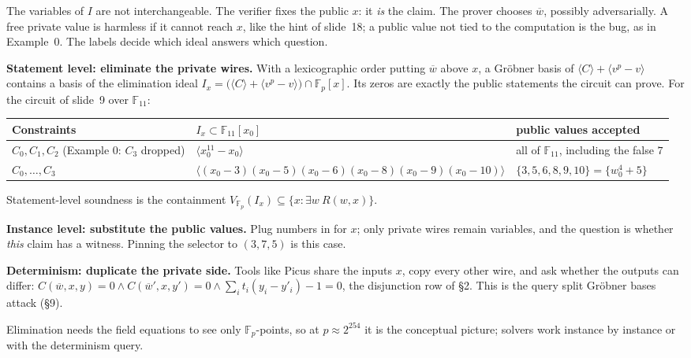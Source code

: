 \documentclass[10pt]{article}
\newcommand{\F}{\mathbb F}\newcommand{\wb}{\overline w}
\newcommand{\sect}[1]{\par\vspace{4pt}{\large\bfseries #1}\par\nobreak\vspace{1pt}}
\begin{document}
\sect{6. Public and private wires play different roles}
The variables of $I$ are not interchangeable. The verifier fixes the public $x$: it \emph{is} the claim. The prover chooses $\wb$,
possibly adversarially. A free private value is harmless if it cannot reach $x$, like the hint of slide~18; a public value not tied to
the computation is the bug, as in Example~0. The labels decide which ideal answers which question.
\par\textbf{Statement level: eliminate the private wires.} With a lexicographic order putting $\wb$ above $x$, a Gr\"obner basis of
$\langle C\rangle+\langle v^p-v\rangle$ contains a basis of the elimination ideal
$I_x=\bigl(\langle C\rangle+\langle v^p-v\rangle\bigr)\cap\F_p[x]$. Its zeros are exactly the public statements the circuit can
prove. For the circuit of slide~9 over $\F_{11}$:
\begin{center}\begin{tabular}{@{}lll@{}}\toprule
Constraints & $I_x\subset\F_{11}[x_0]$ & public values accepted\\\midrule
$C_0,C_1,C_2$ (Example 0: $C_3$ dropped) & $\langle x_0^{11}-x_0\rangle$ & all of $\F_{11}$, including the false $7$\\
$C_0,\dots,C_3$ & $\langle(x_0-3)(x_0-5)(x_0-6)(x_0-8)(x_0-9)(x_0-10)\rangle$ & $\{3,5,6,8,9,10\}=\{w_0^4+5\}$\\
\bottomrule\end{tabular}\end{center}
Statement-level soundness is the containment $V_{\F_p}(I_x)\subseteq\{x : \exists w\ R(w,x)\}$.
\par\textbf{Instance level: substitute the public values.} Plug numbers in for $x$; only private wires remain variables, and the question
is whether \emph{this} claim has a witness. Pinning the selector to $(3,7,5)$ is this case.
\par\textbf{Determinism: duplicate the private side.} Tools like Picus share the inputs $x$, copy every other wire, and ask whether the
outputs can differ: $C(\wb,x,y)=0\wedge C(\wb',x,y')=0\wedge\sum_i t_i(y_i-y'_i)-1=0$, the disjunction row of \S2. This is the
query split Gr\"obner bases attack (\S9).
\par Elimination needs the field equations to see only $\F_p$-points, so at $p\approx2^{254}$ it is the conceptual picture; solvers work
instance by instance or with the determinism query.
\end{document}

